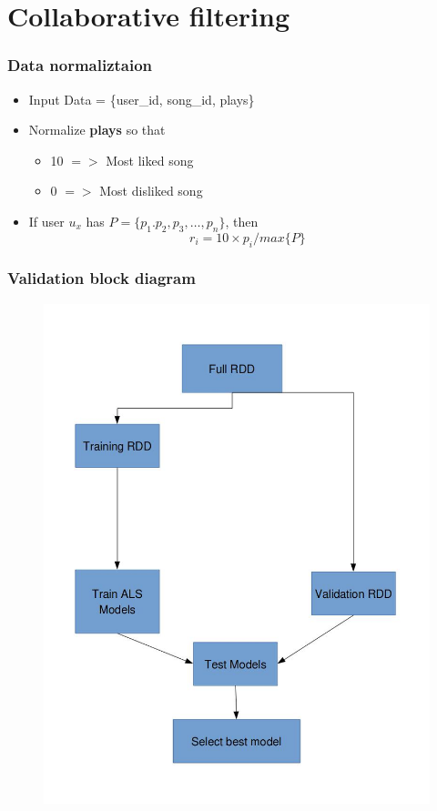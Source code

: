 \documentclass[11pt]{beamer}
\begin{document}
	\section{Collaborative filtering}
	\begin{frame}
		\frametitle{Data normaliztaion}
		\begin{itemize}
			\item Input Data = \{user\_id, song\_id, plays\}
			\item Normalize {\bf plays} so that
			\begin{itemize}
				\item 10 $=>$ Most liked song
				\item 0 $=>$ Most disliked song
			\end{itemize}
			\item If user $u_x$ has $P = \{p_1. p_2, p_3,\dots,p_n	\}$, then
			\begin{equation}
				r_i = 10 \times p_i/max\{P\}
			\end{equation}
		\end{itemize}
	\end{frame}
	\begin{frame}
		\frametitle{Validation block diagram}
		\begin{figure}
		\includegraphics[width=0.5\linewidth]{pictures/Validation.jpg}
		\end{figure}
	\end{frame}
\end{document}
